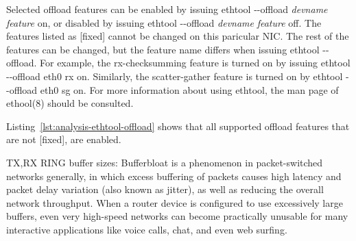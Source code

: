 Selected offload features can be enabled by issuing ethtool -{}-offload {\it{devname}} {\it{feature}} on,
or disabled by issuing ethtool -{}-offload {\it{devname}} {\it{feature}} off.
The features listed as [fixed] cannot be changed on this paricular NIC.
The rest of the features can be changed, but the feature name differs when issuing ethtool -{}-offload.
For example, the rx-checksumming feature is turned on by issuing ethtool -{}-offload eth0 rx on.
Similarly, the scatter-gather feature is turned on by ethtool -{}-offload eth0 sg on.
For more information about using ethtool, the man page of ethool(8) should be consulted.

Listing~\ref{lst:analysis-ethtool-offload} shows that all supported offload features that are not [fixed], are enabled.








TX,RX RING buffer sizes:
Bufferbloat is a phenomenon in packet-switched networks generally,
in which excess buffering of packets causes high latency and packet delay variation (also known as jitter),
as well as reducing the overall network throughput.
When a router device is configured to use excessively large buffers,
even very high-speed networks can become practically unusable for many interactive applications like voice calls,
chat, and even web surfing. %











